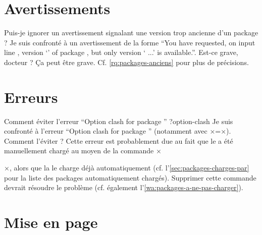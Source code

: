 \section{Avertissements}
\label{sec:avertissements}

\begin{dbfaq}{Puis-je ignorer un avertissement signalant une version trop
    ancienne d'un package ?}{}
  Je suis confronté à un avertissement de la forme \enquote{You have requested,
    on input line , version `' of package
    , but only version ` ...'
    is available.}. Est-ce grave, docteur ?
  \tcblower
  Ça peut être grave. Cf. \vref{rq:packages-anciens} pour plus de précisions.
\end{dbfaq}

\section{Erreurs}
\label{sec:erreurs}

\begin{dbfaq}{Comment éviter l'erreur \enquote{Option clash for package
      } ?}{option-clash}
  Je suis confronté à l'erreur \enquote{Option clash for package
    } (notamment avec ×=×). Comment
  l'éviter ?
  \tcblower
  Cette erreur est probablement due au fait que le  a été
  manuellement chargé au moyen de la commande
  ×\usepackage[...]{×\meta{package}×}×, alors que la \yatcl{} le charge déjà
  automatiquement (cf. l'\vref{sec:packages-charges-par} pour la liste des
  packages automatiquement chargés). Supprimer cette commande devrait résoudre
  le problème (cf. également l'\vref{wa:packages-a-ne-pas-charger}).
\end{dbfaq}


\section{Mise en page}
\label{sec:mise-en-page}

